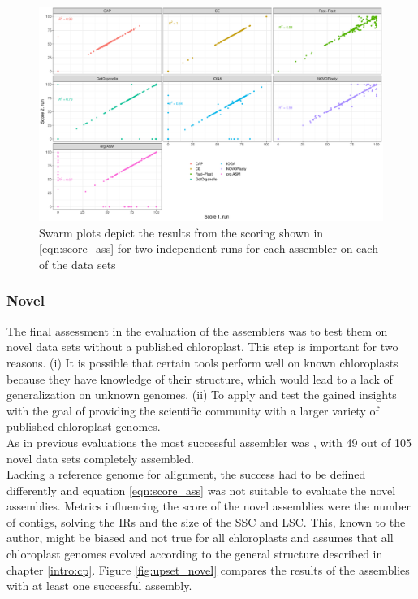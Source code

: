 \begin{figure}[H]
\centering
\includegraphics[height=.49\textheight, width=.95\textwidth]{Figures/repro}
\decoRule
\caption[Comparison between two runs with the same assembler for consistency testing
]{Swarm plots depict the results from the scoring shown in \ref{eqn:score_ass} for two
  independent runs for each assembler on each of the data sets}
\label{fig:consisplot}
\end{figure}


\subsubsection{Novel}
 
The final assessment in the evaluation of the assemblers was to test them on novel data
sets without a published chloroplast. This step is important for two reasons. (i) It is
possible that certain tools perform well on known chloroplasts because they have knowledge
of their structure, which would lead to a lack of generalization on unknown genomes. (ii)
To apply and test the gained insights with the goal of providing
the scientific community with a larger variety of published chloroplast genomes.\\
As in previous evaluations the most successful assembler was \go, with 49 out of 105 novel data sets completely assembled. \\
Lacking a reference genome for alignment, the success had to be defined differently and
equation \ref{eqn:score_ass} was not suitable to evaluate the novel assemblies. Metrics
influencing the score of the novel assemblies were the number of contigs, solving the IRs
and the size of the SSC and LSC. This, known to the author, might be biased and not true
for all chloroplasts and assumes that all chloroplast genomes evolved according to the
general structure described in chapter \ref{intro:cp}. Figure \ref{fig:upset_novel}
compares the results of the assemblies with at least one successful assembly.

